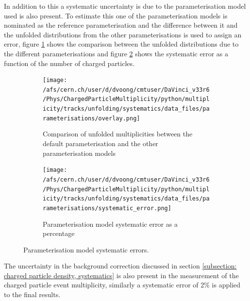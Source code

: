 In addition to this a systematic uncertainty is due to the parameterisation model used is also present. To estimate this one of the parameterisation models is nominated as the reference parameterisation and the difference between it and the unfolded distributions from the other parameterisations is used to assign an error, figure \ref{fig: parameterisation comparison} shows the comparison between the unfolded distributions due to the different parameterisations and figure \ref{fig: parameterisation systematic} shows the systematic error as a function of the number of charged particles.

\begin{figure}[h]
	\begin{subfigure}{0.49\textwidth}
		\texttt{[image: /afs/cern.ch/user/d/dvoong/cmtuser/DaVinci\_v33r6/Phys/ChargedParticleMultiplicity/python/multiplicity/tracks/unfolding/systematics/data\_files/parameterisations/overlay.png]}
		\caption{Comparison of unfolded multiplicities between the default parameterisation and the other parameterisation models}
		\label{fig: parameterisation comparison}
	\end{subfigure}
	\begin{subfigure}{0.49\textwidth}
		\texttt{[image: /afs/cern.ch/user/d/dvoong/cmtuser/DaVinci\_v33r6/Phys/ChargedParticleMultiplicity/python/multiplicity/tracks/unfolding/systematics/data\_files/parameterisations/systematic\_error.png]}
		\caption{Parameterisation model systematic error as a percentage}
		\label{fig: parameterisation systematic}
	\end{subfigure}
	\caption{Parameterisation model systematic errors.}
	\label{fig: parameterisation model systematic errors}
\end{figure}

The uncertainty in the background correction discussed in section \ref{subsection: charged particle density, systematics} is also present in the measurement of the charged particle event multiplicity, similarly a systematic error of 2\% is applied to the final results.

